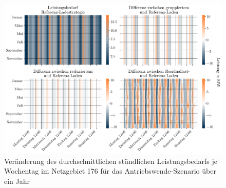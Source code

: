 \begin{figure}[H]
    \centering
    \includegraphics[width=\textwidth]{Bilder/residual_load_diff}
    \caption{Veränderung des durchschnittlichen stündlichen Leistungsbedarfs je Wochentag im Netzgebiet \num{176} für das Antriebswende-Szenario über ein Jahr}\label{fig:residual_load_diff}
\end{figure}